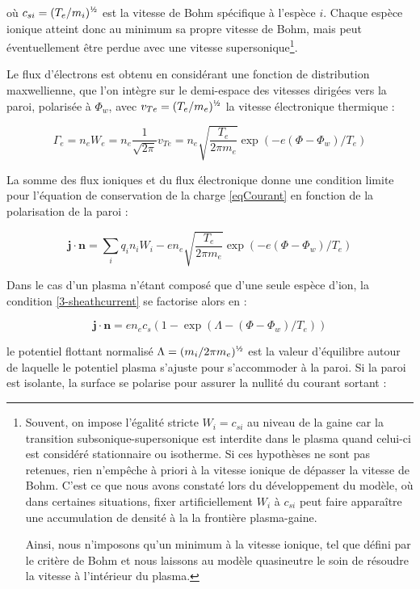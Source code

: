 \begin{refsection}
où $c_{si}=(T_e/m_i)^{\text{\textonehalf}}$ est la vitesse de Bohm
spécifique à l'espèce $i$.
Chaque espèce ionique atteint donc au minimum sa propre vitesse de Bohm, mais
peut éventuellement être perdue avec une vitesse
supersonique\footnote{Souvent, on impose l'égalité stricte $W_i=c_{si}$ au
niveau de la gaine car la transition subsonique-supersonique est interdite dans
le plasma quand celui-ci est considéré stationnaire ou isotherme. Si ces
hypothèses ne sont pas retenues, rien n'empêche à priori à la vitesse ionique de
dépasser la vitesse de Bohm. C'est ce que nous avons constaté lors du
développement du modèle, où dans certaines situations, fixer artificiellement
$W_i$ à $c_{si}$ peut faire apparaître une accumulation de densité à la la
frontière plasma-gaine.

Ainsi, nous n'imposons qu'un minimum à la vitesse ionique, tel que défini par
le critère de Bohm et nous laissons au modèle quasineutre le soin de résoudre la
vitesse à l'intérieur du plasma.}.

Le flux d'électrons est obtenu en considérant une fonction de distribution
maxwellienne, que l'on intègre sur le demi-espace des vitesses dirigées vers la
paroi, polarisée à $\Phi_w$, avec $v_{Te}=(T_e/m_e)^{\text{\textonehalf}}$ la
vitesse électronique thermique :

\begin{equation}
\Gamma_e=n_eW_e=n_e\frac{1}{\sqrt{2\pi}}v_{Te}=n_e\sqrt{\frac{T_e}{2\pi
m_e}}\exp(-e(\Phi-\Phi_w)/T_e)
\end{equation}

La somme des flux
ioniques et du flux électronique donne une condition limite pour l'équation de
conservation de la charge \eqref{eqCourant} en fonction de la polarisation de la paroi
:

\begin{equation}
\label{3-sheathcurrent}
\mathbf{j}\cdot\mathbf{n}=\sum_i{q_in_iW_i}
-en_e\sqrt{\frac{T_e}{2\pi
m_e}}\exp(-e(\Phi-\Phi_w)/T_e)
\end{equation}

Dans
le cas d'un plasma n'étant composé que d'une seule espèce d'ion, 
la condition \ref{3-sheathcurrent} se factorise alors en :

\begin{equation}
\mathbf{j}\cdot\mathbf{n}=en_ec_s(1-\exp(\Lambda-(\Phi-\Phi_w)/T_e))
\end{equation}

le potentiel flottant normalisé $\Lambda=({m_i}/{2\pi
m_e})^{\text{\textonehalf}}$ est la valeur d'équilibre autour de laquelle
le potentiel plasma s'ajuste pour s'accommoder à la paroi.
Si la paroi est isolante, la surface se polarise
pour assurer la nullité du courant sortant :


\end{refsection}
